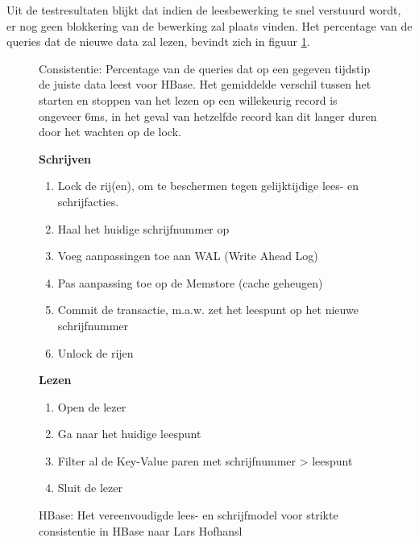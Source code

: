 Uit de testresultaten blijkt dat indien de leesbewerking te snel verstuurd wordt, er nog geen blokkering van de bewerking zal plaats vinden. Het percentage van de queries dat de nieuwe data zal lezen, bevindt zich in figuur \ref{fig:consistentie-hbase-correct}.


\begin{figure}[!htf]

\caption{Consistentie: Percentage van de queries dat op een gegeven tijdstip de juiste data leest voor HBase. Het gemiddelde verschil tussen het starten en stoppen van het lezen op een willekeurig record is ongeveer 6ms, in het geval van hetzelfde record kan dit langer duren door het wachten op de lock. }
\label{fig:consistentie-hbase-correct}
\end{figure}


\begin{figure}[tb!]
	\begin{minipage}{0.5\textwidth} 
	\textbf{Schrijven}
	\begin{enumerate}
	\item Lock de rij(en), om te beschermen tegen gelijktijdige lees- en schrijfacties. 
	\item Haal het huidige schrijfnummer op
	\item Voeg aanpassingen toe aan WAL (Write Ahead Log)
	\item Pas aanpassing toe op de Memstore (cache geheugen)
	\item Commit de transactie, m.a.w. zet het leespunt op het nieuwe schrijfnummer
	\item Unlock de rijen
	\end{enumerate}
	\end{minipage} \hfill
	\begin{minipage}{0.3\textwidth} 
	\textbf{Lezen}
	\begin{enumerate}
	\item Open de lezer
	\item Ga naar het huidige leespunt
	\item Filter al de Key-Value paren met schrijfnummer > leespunt
	\item Sluit de lezer
	\end{enumerate}
	\end{minipage}
	\caption{HBase: Het vereenvoudigde lees- en schrijfmodel voor strikte consistentie in HBase naar Lars Hofhansl\cite{hbase-acid}}\label{fig:consistency-hbase-uitleg}
\end{figure}

